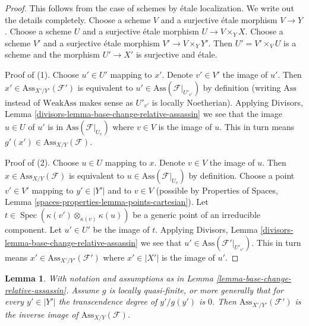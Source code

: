 \documentclass{stacks-project}
\theoremstyle{plain}
\newtheorem{lemma}[subsection]{Lemma}
\theoremstyle{definition}
\theoremstyle{remark}
\numberwithin{equation}{subsection}
\def\Spec{\mathop{\mathrm{Spec}}}
\begin{document}
\begin{proof}
This follows from the case of schemes by \'etale localization.
We write out the details completely. Choose a scheme
$V$ and a surjective \'etale morphism $V \to Y$.
Choose a scheme $U$ and a surjective
\'etale morphism $U \to V \times_Y X$. Choose a scheme $V'$
and a surjective \'etale morphism $V' \to V \times_Y Y'$.
Then $U' = V' \times_V U$ is a scheme and the morphism
$U' \to X'$ is surjective and \'etale.

\medskip\noindent
Proof of (1). Choose $u' \in U'$ mapping to $x'$.
Denote $v' \in V'$ the image of $u'$.
Then $x' \in \text{Ass}_{X'/Y'}(\mathcal{F}')$ is
equivalent to $u' \in \text{Ass}(\mathcal{F}|_{U'_{v'}})$
by definition (writing $\text{Ass}$ instead of $\text{WeakAss}$
makes sense as $U'_{v'}$ is locally Noetherian).
Applying Divisors, Lemma \ref{divisors-lemma-base-change-relative-assassin}
we see that the image $u \in U$ of $u'$ is in
$\text{Ass}(\mathcal{F}|_{U_v})$ where $v \in V$ is the image of $u$.
This in turn means $g'(x') \in \text{Ass}_{X/Y}(\mathcal{F})$.

\medskip\noindent
Proof of (2). Choose $u \in U$ mapping to $x$.
Denote $v \in V$ the image of $u$.
Then $x \in \text{Ass}_{X/Y}(\mathcal{F})$ is
equivalent to $u \in \text{Ass}(\mathcal{F}|_{U_v})$
by definition. Choose a point $v' \in V'$ mapping
to $y' \in |Y'|$ and to $v \in V$ (possible by
Properties of Spaces, Lemma \ref{spaces-properties-lemma-points-cartesian}).
Let $t \in \Spec(\kappa(v') \otimes_{\kappa(v)} \kappa(u))$
be a generic point of an irreducible component.
Let $u' \in U'$ be the image of $t$.
Applying Divisors, Lemma \ref{divisors-lemma-base-change-relative-assassin}
we see that $u' \in \text{Ass}(\mathcal{F}'|_{U'_{v'}})$.
This in turn means $x' \in \text{Ass}_{X'/Y'}(\mathcal{F}')$
where $x' \in |X'|$ is the image of $u'$.
\end{proof}

\begin{lemma}
\label{lemma-base-change-relative-assassin-quasi-finite}
With notation and assumptions as in
Lemma \ref{lemma-base-change-relative-assassin}.
Assume $g$ is locally quasi-finite, or more generally that
for every $y' \in |Y'|$ the transcendence degree of $y'/g(y')$ is $0$.
Then $\text{Ass}_{X'/Y'}(\mathcal{F}')$ is the inverse image of
$\text{Ass}_{X/Y}(\mathcal{F})$.
\end{lemma}
\end{document}
